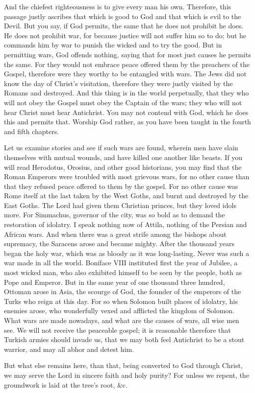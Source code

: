 And the chiefest righteousness is to give every man his own. Therefore, this passage justly ascribes that which is good to God and that which is evil to the Devil. But you say, if God permits, the same that he does not prohibit he does. He does not prohibit war, for because justice will not suffer him so to do; but he commands him by war to punish the wicked and to try the good. But in permitting wars, God offends nothing, saying that for most just causes he permits the same. For they would not embrace peace offered them by the preachers of the Gospel, therefore were they worthy to be entangled with wars. The Jews did not know the day of Christ’s visitation, therefore they were justly visited by the Romans and destroyed. And this thing is in the world perpetually, that they who will not obey the Gospel must obey the Captain of the wars; they who will not hear Christ must hear Antichrist. You may not contend with God, which he does this and permits that. Worship God rather, as you have been taught in the fourth and fifth chapters.

Let us examine stories and see if such wars are found, wherein men have slain themselves with mutual wounds, and have killed one another like beasts. If you will read Herodotus, Orosius, and other good historians, you may find that the Roman Emperors were troubled with most grievous wars, for no other cause than that they refused peace offered to them by the gospel. For no other cause was Rome itself at the last taken by the West Goths, and burnt and destroyed by the East Goths. The Lord had given them Christian princes, but they loved idols more. For Simmachus, governor of the city, was so bold as to demand the restoration of idolatry. I speak nothing now of Attila, nothing of the Persian and African wars. And when there was a great strife among the bishops about supremacy, the Saracens arose and became mighty. After the thousand years began the holy war, which was as bloody as it was long-lasting. Never was such a war made in all the world. Boniface VIII instituted first the year of Jubilee, a most wicked man, who also exhibited himself to be seen by the people, both as Pope and Emperor. But in the same year of one thousand three hundred, Ottoman arose in Asia, the scourge of God, the founder of the emperors of the Turks who reign at this day. For so when Solomon built places of idolatry, his enemies arose, who wonderfully vexed and afflicted the kingdom of Solomon. What wars are made nowadays, and what are the causes of wars, all wise men see. We will not receive the peaceable gospel; it is reasonable therefore that Turkish armies should invade us, that we may both feel Antichrist to be a stout warrior, and may all abhor and detest him.

But what else remains here, than that, being converted to God through Christ, we may serve the Lord in sincere faith and holy purity? For unless we repent, the groundwork is laid at the tree’s root, \&c.
